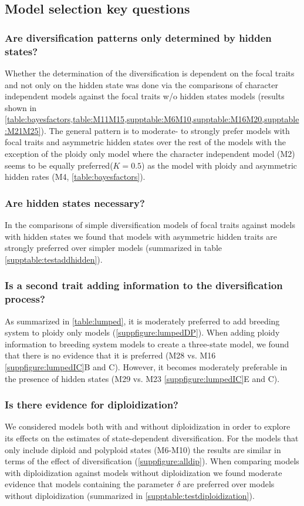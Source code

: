 \subsection{Model selection key questions}
\subsubsection{Are diversification patterns only determined by hidden states?}
Whether the determination of the diversification is dependent on the focal traits and not only on the hidden state was done via the comparisons of character independent models against the focal traits w/o hidden states models (results shown in  \cref{table:bayesfactors,table:M11M15,supptable:M6M10,supptable:M16M20,supptable:M21M25}).
The general pattern is to moderate- to strongly prefer models with focal traits and asymmetric hidden states over the rest of the models with the exception of the ploidy only model where the character independent model (M2) seems to be equally preferred($K=0.5$) as the model with ploidy and asymmetric hidden rates (M4, \cref{table:bayesfactors}).

\subsubsection{Are hidden states necessary?}
In the comparisons of simple diversification models of focal traits against models with hidden states we found that models with asymmetric hidden traits are strongly preferred over simpler models (summarized in table \cref{supptable:testaddhidden}).

\subsubsection{Is a second trait adding information to the diversification process?}
As summarized in  \cref{table:lumped}, it is moderately preferred to add breeding system to ploidy only models (\cref{suppfigure:lumpedDP}).
When adding ploidy information to breeding system models to create a three-state model, we found that there is no evidence that it is preferred (M28 vs. M16 \cref{suppfigure:lumpedIC}B and C). 
However, it becomes moderately preferable in the presence of hidden states (M29 vs. M23  \cref{suppfigure:lumpedIC}E and C).

\subsubsection{Is there evidence for diploidization?}
We considered models both with and without diploidization in order to explore its effects on the estimates of state-dependent diversification.
For the models that only include diploid and polyploid states (M6-M10) the results are similar in terms of the effect of diversification (\cref{suppfigure:alldip}).
When comparing models with diploidization against models without diploidization we found moderate evidence that models containing the parameter $\delta$ are preferred over models without diploidization (summarized in \cref{supptable:testdiploidization}).


